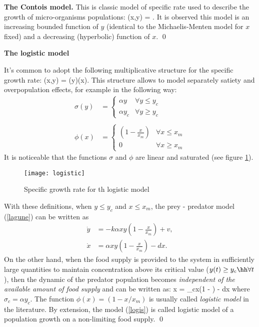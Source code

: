 \begin{exemple}{\bf The Contois model.}
This is classic model of specific rate  used to describe the growth of micro-organisms populations:
\eqnn
\mu(x,y) = .
\eeqnn
It is observed this model is an increasing bounded function of $y$ (identical to the Michaelis-Menten model for $x$ fixed) and a decreasing (hyperbolic) function of $x$.
  \qed
\end{exemple}

\begin{exemple}{\bf The logistic model}

It's common to adopt the following multiplicative structure for the specific growth rate:
\eqnn
\mu(x,y) = \sigma(y)\phi(x).
\eeqnn
This structure allows to model separately satiety and overpopulation effects, for example in the following way:
\begin{equation*} \begin{split} \sigma(y) &= \left\{\begin{array}{ll}
\alpha y & \forall y \leq y_{c} \\ \alpha y_{c} & \forall y \geq y_{c} \end{array} \right.\\ \\
\phi(x) &= 
\left\{ \begin{array}{ll} (1 - \frac{x}{x_{m}}) & \forall x \leq x_{m} \\ 0  & \forall x \geq x_{m}
\end{array} \right.
\end{split} \end{equation*}
It is noticeable that the functions $\sigma$ and $\phi$ are linear and saturated (see figure \ref{Fig:logistic}).
\begin{figure}[htbp] 
   \centering
   \texttt{[image: logistic]} 
   \caption{Specific growth rate for th logistic model}
   \label{Fig:logistic}
\end{figure}
With these definitions, when $y \leq y_{c}$ and $x \leq x_{m}$, the prey - predator model (\ref{lagune}) can be written as
\begin{equation*} \begin{split}
\dot y &= -k\alpha xy(1 - \frac{x}{x_{m}}) + v, \\
\dot x &= \alpha xy(1 - \frac{x}{x_{m}}) - dx.
\end{split} \end{equation*}
On the other hand, when the food supply is provided to the system  in sufficiently large quantities to maintain concentration above its critical value ($y(t) \geq y_{c} \hh \forall t$), then the dynamic of the predator population becomes {\em independent of the available amount of food supply} and can be written as:
\eqn
\dot x = \sigma_{c}x(1 - ) - dx  \label{logis}
\eeqn
where $\sigma_c = \alpha y_c$. The function $\phi(x) = (1 - x/x_{m})$ is usually called {\em logistic model} in the literature.
By extension, the model (\ref{logis}) is called logistic model of a population growth on a non-limiting food supply. \qed
\end{exemple}

